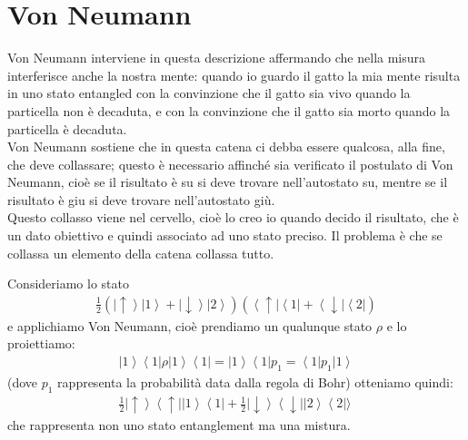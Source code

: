 \section{Von Neumann} %
Von Neumann interviene in questa descrizione affermando che nella misura interferisce anche la nostra mente: quando io guardo il gatto la mia mente risulta in uno stato entangled con la convinzione che il gatto sia vivo quando la particella non è decaduta, e con la convinzione che il gatto sia morto quando la particella è decaduta.\\
Von Neumann sostiene che in questa catena ci debba essere qualcosa, alla fine, che deve collassare; questo è necessario affinché sia verificato il postulato di Von Neumann, cioè se il risultato è su si deve trovare nell'autostato su, mentre se il risultato è giu si deve trovare nell'autostato giù.\\
Questo collasso viene nel cervello, cioè lo creo io quando decido il risultato, che è un dato obiettivo e quindi associato ad uno stato preciso.
Il problema è che se collassa un elemento della catena collassa tutto.

Consideriamo lo stato
\begin{equation}\begin{split}
\frac{1}{2}(\left|\uparrow\right\rangle \left|1\right\rangle + \left|\downarrow\right\rangle \left|2\right\rangle)(\left\langle \uparrow\right| \left\langle 1\right| + \left\langle \downarrow\right|\left\langle 2\right|)
\end{split}\end{equation} 
e applichiamo Von Neumann, cioè prendiamo un qualunque stato $\rho$ e lo proiettiamo:
\begin{equation}\begin{split}
\left|1\right\rangle \left\langle 1\right| \rho \left|1\right\rangle \left\langle 1\right|=\left|1\right\rangle \left\langle 1\right| p_{1}=\left\langle 1\right| p_{1} \left|1\right\rangle
\end{split}\end{equation}
(dove $p_{1}$ rappresenta la probabilità data dalla regola di Bohr) otteniamo quindi:
\begin{equation}\begin{split}
\frac{1}{2} \left|\uparrow\right\rangle \left\langle\uparrow\right| \left|1\right\rangle \left\langle 1\right| + \frac{1}{2}\left|\downarrow\right\rangle \left\langle\downarrow\right| \left|2\right\rangle \left\langle 2\right|\rangle\
\end{split}\end{equation}
che rappresenta non uno stato entanglement ma una mistura.

